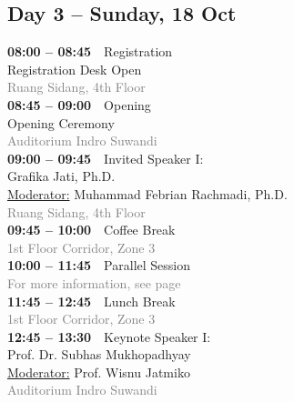 \documentclass[10pt,a4paper]{article}
\begin{document}
\begin{minipage}[t]{0.48\textwidth}
\vspace{0pt}


\subsection*{%
    \colorbox{gray!20}{Day 3 -- Sunday, 18 Oct}%
}

\textbf{08:00 -- 08:45}~~Registration\\
{Registration Desk Open}\\
\textcolor{gray}{Ruang Sidang, 4th Floor}\\

\textbf{08:45 -- 09:00}~~Opening\\
{Opening Ceremony}\\
\textcolor{gray}{Auditorium Indro Suwandi}\\

\textbf{09:00 -- 09:45}~~Invited Speaker I:\\
{Grafika Jati, Ph.D.}\\
\underline{Moderator:} Muhammad Febrian Rachmadi, Ph.D.\\
\textcolor{gray}{Ruang Sidang, 4th Floor}\\

\textbf{09:45 -- 10:00}~~Coffee Break\\
\textcolor{gray}{1st Floor Corridor, Zone 3}\\

\textbf{10:00 -- 11:45}~~Parallel Session\\
\textcolor{gray}{For more information, see page~\pageref{sec:technical-program}}\\

\textbf{11:45 -- 12:45}~~Lunch Break\\
\textcolor{gray}{1st Floor Corridor, Zone 3}\\

\textbf{12:45 -- 13:30}~~Keynote Speaker I:\\
{Prof. Dr. Subhas Mukhopadhyay}\\
\underline{Moderator:} Prof. Wisnu Jatmiko \\
\textcolor{gray}{Auditorium Indro Suwandi}\\


\end{minipage}
\end{document}
